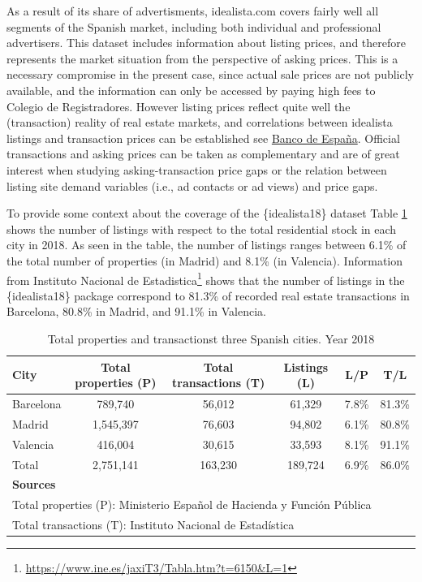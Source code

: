 \documentclass[Royal,times,sageh]{sagej}
\begin{document}
As a result of its share of advertisments, idealista.com covers fairly
well all segments of the Spanish market, including both individual and
professional advertisers. This dataset includes information about
listing prices, and therefore represents the market situation from the
perspective of asking prices. This is a necessary compromise in the
present case, since actual sale prices are not publicly available, and
the information can only be accessed by paying high fees to Colegio de
Registradores. However listing prices reflect quite well the
(transaction) reality of real estate markets, and correlations between
idealista listings and transaction prices can be established see
\href{https://papers.ssrn.com/sol3/papers.cfm?abstract_id=3400031}{Banco
de España}. Official transactions and asking prices can be taken as
complementary and are of great interest when studying asking-transaction
price gaps or the relation between listing site demand variables (i.e.,
ad contacts or ad views) and price gaps.

To provide some context about the coverage of the \{idealista18\}
dataset Table \ref{tab:transactions} shows the number of listings with
respect to the total residential stock in each city in 2018. As seen in
the table, the number of listings ranges between 6.1\% of the total
number of properties (in Madrid) and 8.1\% (in Valencia). Information
from Instituto Nacional de Estadistica\footnote{\url{https://www.ine.es/jaxiT3/Tabla.htm?t=6150&L=1}}
shows that the number of listings in the \{idealista18\} package
correspond to 81.3\% of recorded real estate transactions in Barcelona,
80.8\% in Madrid, and 91.1\% in Valencia.

\begin{table}[!ht]
    \centering
      \caption{Total properties and transactionst three Spanish cities. Year 2018} 
  \label{tab:transactions} 
    \begin{tabular}{lccccc}
        City & Total properties (P) & Total transactions (T) & Listings (L) & L/P & T/L \\
        \hline
        Barcelona &  789,740  &  56,012  &  61,329  & 7.8\% & 81.3\%  \\ 
        Madrid &  1,545,397  &  76,603  &  94,802  & 6.1\%  & 80.8\% \\ 
        Valencia &  416,004  &  30,615  &  33,593  & 8.1\% & 91.1\% \\ 
        \hline
        Total &  2,751,141  &  163,230  &  189,724  & 6.9\% & 86.0\% \\ 
        \hline
        \multicolumn{6}{l}{{\footnotesize \textbf{Sources}}}\\
        \multicolumn{6}{l}{{\footnotesize Total properties (P): Ministerio Español de Hacienda y Función Pública}}\\
        \multicolumn{6}{l}{{\footnotesize Total transactions (T): Instituto Nacional de Estadística}}\\
    \end{tabular}
\end{table}
\end{document}

